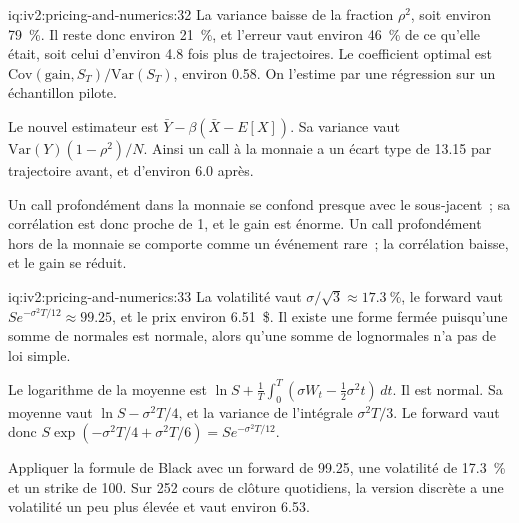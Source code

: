 \begin{solution}{iq:iv2:pricing-and-numerics:32}
La variance baisse de la fraction $\rho^2$, soit environ 79~\%. Il reste donc environ 21~\%, et l'erreur vaut environ 46~\% de ce qu'elle était, soit celui d'environ 4.8 fois plus de trajectoires. Le coefficient optimal est $\text{Cov}(\text{gain}, S_T)/\text{Var}(S_T)$, environ 0.58. On l'estime par une régression sur un échantillon pilote.

Le nouvel estimateur est $\bar Y - \beta(\bar X - E[X])$. Sa variance vaut $\text{Var}(Y)(1 - \rho^2)/N$. Ainsi un call à la monnaie a un écart type de 13.15 par trajectoire avant, et d'environ 6.0 après.

Un call profondément dans la monnaie se confond presque avec le sous-jacent~; sa corrélation est donc proche de 1, et le gain est énorme. Un call profondément hors de la monnaie se comporte comme un événement rare~; la corrélation baisse, et le gain se réduit.

\end{solution}

\begin{solution}{iq:iv2:pricing-and-numerics:33}
La volatilité vaut $\sigma/\sqrt 3 \approx 17.3~\%$, le forward vaut $Se^{-\sigma^2T/12} \approx 99.25$, et le prix environ 6.51~\$. Il existe une forme fermée puisqu'une somme de normales est normale, alors qu'une somme de lognormales n'a pas de loi simple.

Le logarithme de la moyenne est $\ln S + \frac1T\int_0^T(\sigma W_t - \tfrac12\sigma^2t)\,dt$. Il est normal. Sa moyenne vaut $\ln S - \sigma^2T/4$, et la variance de l'intégrale $\sigma^2T/3$. Le forward vaut donc $S\exp(-\sigma^2T/4 + \sigma^2T/6) = Se^{-\sigma^2T/12}$.

Appliquer la formule de Black avec un forward de 99.25, une volatilité de 17.3~\% et un strike de 100. Sur 252 cours de clôture quotidiens, la version discrète a une volatilité un peu plus élevée et vaut environ 6.53.

\end{solution}

